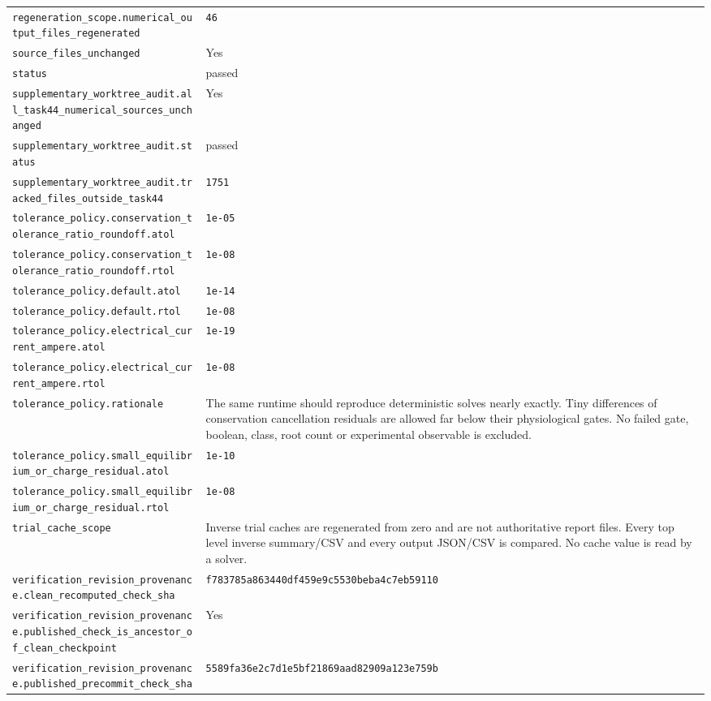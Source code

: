 \begin{longtable}{p{.46\linewidth}p{.46\linewidth}}
\nolinkurl{regeneration_scope.numerical_output_files_regenerated} & \texttt{46} \\
\nolinkurl{source_files_unchanged} & Yes \\
\nolinkurl{status} & passed \\
\nolinkurl{supplementary_worktree_audit.all_task44_numerical_sources_unchanged} & Yes \\
\nolinkurl{supplementary_worktree_audit.status} & passed \\
\nolinkurl{supplementary_worktree_audit.tracked_files_outside_task44} & \texttt{1751} \\
\nolinkurl{tolerance_policy.conservation_tolerance_ratio_roundoff.atol} & \texttt{1e-05} \\
\nolinkurl{tolerance_policy.conservation_tolerance_ratio_roundoff.rtol} & \texttt{1e-08} \\
\nolinkurl{tolerance_policy.default.atol} & \texttt{1e-14} \\
\nolinkurl{tolerance_policy.default.rtol} & \texttt{1e-08} \\
\nolinkurl{tolerance_policy.electrical_current_ampere.atol} & \texttt{1e-19} \\
\nolinkurl{tolerance_policy.electrical_current_ampere.rtol} & \texttt{1e-08} \\
\nolinkurl{tolerance_policy.rationale} & The same runtime should reproduce deterministic solves nearly exactly. Tiny differences of conservation cancellation residuals are allowed far below their physiological gates. No failed gate, boolean, class, root count or experimental observable is excluded. \\
\nolinkurl{tolerance_policy.small_equilibrium_or_charge_residual.atol} & \texttt{1e-10} \\
\nolinkurl{tolerance_policy.small_equilibrium_or_charge_residual.rtol} & \texttt{1e-08} \\
\nolinkurl{trial_cache_scope} & Inverse trial caches are regenerated from zero and are not authoritative report files. Every top level inverse summary/CSV and every output JSON/CSV is compared. No cache value is read by a solver. \\
\nolinkurl{verification_revision_provenance.clean_recomputed_check_sha} & \nolinkurl{f783785a863440df459e9c5530beba4c7eb59110} \\
\nolinkurl{verification_revision_provenance.published_check_is_ancestor_of_clean_checkpoint} & Yes \\
\nolinkurl{verification_revision_provenance.published_precommit_check_sha} & \nolinkurl{5589fa36e2c7d1e5bf21869aad82909a123e759b} \\
\end{longtable}
\endgroup



